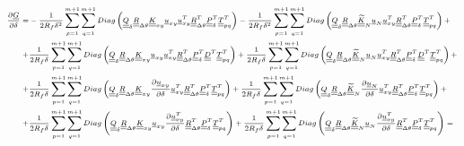 \documentclass[a4paper]{jpconf}
\begin{document}
\begin{equation}
\scriptsize
\begin{split}
\frac{\partial \underline{G}}{\partial \delta}=&-\frac{1}{2R_{f}\delta^{2}}\sum_{p=1}^{m+1}\sum_{q=1}^{m+1}Diag\left(\underline{\underline{Q}}_{\delta}\underline{\underline{R}}_{\Delta\theta}\underline{\underline{K}}_{xy}\underline{u}_{xy}\underline{u}_{xy}^{T}\underline{\underline{R}}_{\Delta\theta}^{T}\underline{\underline{P}}_{\delta}^{T}\underline{\underline{T}}_{pq}^{T}\right)-\frac{1}{2R_{f}\delta^{2}}\sum_{p=1}^{m+1}\sum_{q=1}^{m+1}Diag\left(\underline{\underline{Q}}_{\delta}\underline{\underline{R}}_{\Delta\theta}\underline{\underline{\widetilde{K}}}_{N}\underline{u}_{N}\underline{u}_{xy}^{T}\underline{\underline{R}}_{\Delta\theta}^{T}\underline{\underline{P}}_{\delta}^{T}\underline{\underline{T}}_{pq}^{T}\right)+\\
+&\frac{1}{2R_{f}\delta}\sum_{p=1}^{m+1}\sum_{q=1}^{m+1}Diag\left(\underline{\underline{Q}}_{\delta}\underline{\underline{R}}_{\Delta\theta}\underline{\underline{K}}_{xy}\underline{u}_{xy}\underline{u}_{xy}^{T}\underline{\underline{R}}_{\Delta\theta}^{T}\underline{\underline{P}}_{\delta}^{T}\underline{\underline{D}}^{T}\underline{\underline{T}}_{pq}^{T}\right)+\frac{1}{2R_{f}\delta}\sum_{p=1}^{m+1}\sum_{q=1}^{m+1}Diag\left(\underline{\underline{Q}}_{\delta}\underline{\underline{R}}_{\Delta\theta}\underline{\underline{\widetilde{K}}}_{N}\underline{u}_{N}\underline{u}_{xy}^{T}\underline{\underline{R}}_{\Delta\theta}^{T}\underline{\underline{P}}_{\delta}^{T}\underline{\underline{D}}^{T}\underline{\underline{T}}_{pq}^{T}\right)+\\
+&\frac{1}{2R_{f}\delta}\sum_{p=1}^{m+1}\sum_{q=1}^{m+1}Diag\left(\underline{\underline{Q}}_{\delta}\underline{\underline{R}}_{\Delta\theta}\underline{\underline{K}}_{xy}\frac{\partial \underline{u}_{xy}}{\partial \delta}\underline{u}_{xy}^{T}\underline{\underline{R}}_{\Delta\theta}^{T}\underline{\underline{P}}_{\delta}^{T}\underline{\underline{T}}_{pq}^{T}\right)+\frac{1}{2R_{f}\delta}\sum_{p=1}^{m+1}\sum_{q=1}^{m+1}Diag\left(\underline{\underline{Q}}_{\delta}\underline{\underline{R}}_{\Delta\theta}\underline{\underline{\widetilde{K}}}_{N}\frac{\partial \underline{u}_{N}}{\partial \delta}\underline{u}_{xy}^{T}\underline{\underline{R}}_{\Delta\theta}^{T}\underline{\underline{P}}_{\delta}^{T}\underline{\underline{T}}_{pq}^{T}\right)+\\
+&\frac{1}{2R_{f}\delta}\sum_{p=1}^{m+1}\sum_{q=1}^{m+1}Diag\left(\underline{\underline{Q}}_{\delta}\underline{\underline{R}}_{\Delta\theta}\underline{\underline{K}}_{xy}\underline{u}_{xy}\frac{\partial \underline{u}_{xy}^{T}}{\partial \delta}\underline{\underline{R}}_{\Delta\theta}^{T}\underline{\underline{P}}_{\delta}^{T}\underline{\underline{T}}_{pq}^{T}\right)+\frac{1}{2R_{f}\delta}\sum_{p=1}^{m+1}\sum_{q=1}^{m+1}Diag\left(\underline{\underline{Q}}_{\delta}\underline{\underline{R}}_{\Delta\theta}\underline{\underline{\widetilde{K}}}_{N}\underline{u}_{N}\frac{\partial \underline{u}_{xy}^{T}}{\partial \delta}\underline{\underline{R}}_{\Delta\theta}^{T}\underline{\underline{P}}_{\delta}^{T}\underline{\underline{T}}_{pq}^{T}\right)=\\

\end{split}
\end{equation}
\end{document}
